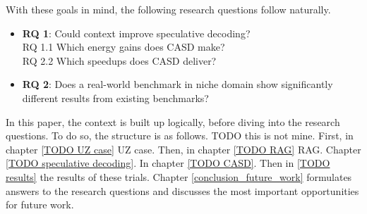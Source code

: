 With these goals in mind, the following research questions follow naturally.

\begin{itemize}
    \item \textbf{RQ 1}: Could context improve speculative decoding? \\ RQ 1.1 Which energy gains does CASD make? \\ RQ 2.2 Which speedups does CASD deliver?
    \item \textbf{RQ 2}: Does a real-world benchmark in niche domain show significantly different results from existing benchmarks?
\end{itemize}

In this paper, the context is built up logically, before diving into the research questions. To do so, the structure is as follows. TODO this is not mine. First, in chapter \ref{TODO UZ case} UZ case. Then, in chapter \ref{TODO RAG} RAG. Chapter \ref{TODO speculative decoding}. In chapter \ref{TODO CASD}. Then in \ref{TODO results} the results of these trials. Chapter \ref{conclusion_future_work} formulates answers to the research questions and discusses the most important opportunities for future work.\\